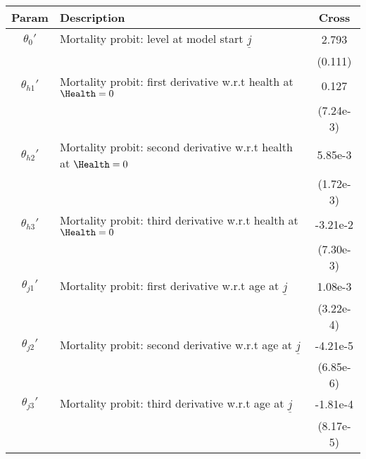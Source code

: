 \begin{table}[ht]\label{CrossWomenMortParams}
\footnotesize
\begin{center}
\begin{tabular}{clc}
\hline \hline
Param & Description & Cross \\
\hline
$\theta_{0}'$ & Mortality probit: level at model start $\underline{j}$ & 2.793 \\
 & & (0.111) \\
$\theta_{h1}'$ & Mortality probit: first derivative w.r.t health at $\Health=0$ & 0.127 \\
 & & (7.24e-3) \\
$\theta_{h2}'$ & Mortality probit: second derivative w.r.t health at $\Health=0$ & 5.85e-3 \\
 & & (1.72e-3) \\
$\theta_{h3}'$ & Mortality probit: third derivative w.r.t health at $\Health=0$ & -3.21e-2 \\
 & & (7.30e-3) \\
$\theta_{j1}'$ & Mortality probit: first derivative w.r.t age at $\underline{j}$ & 1.08e-3 \\
 & & (3.22e-4) \\
$\theta_{j2}'$ & Mortality probit: second derivative w.r.t age at $\underline{j}$ & -4.21e-5 \\
 & & (6.85e-6) \\
$\theta_{j3}'$ & Mortality probit: third derivative w.r.t age at $\underline{j}$ & -1.81e-4 \\
 & & (8.17e-5) \\
\hline\hline
\end{tabular}
\end{center}
\end{table}
